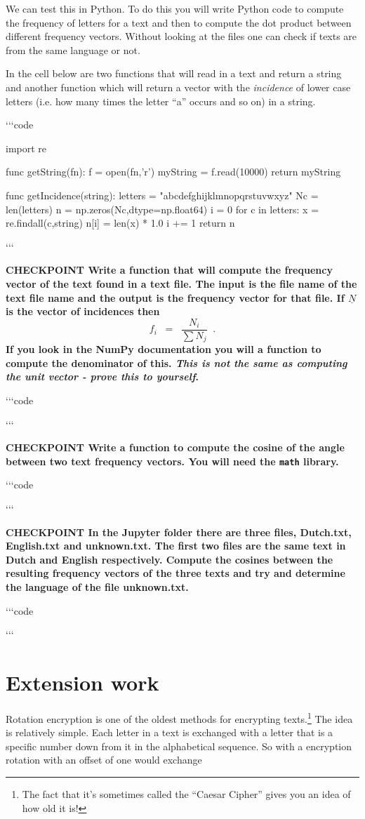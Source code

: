 \documentclass[11pt]{amsart}
\renewcommand{\v}[1]{\underline{#1}}
\newcommand{\cli}[1]{`{}`{}`{}code
#1 
`{}`{}`{}}
\newcommand{\checkpoint}[1]{{\bf CHECKPOINT \newline #1 \newline} 

`{}`{}`{}code
 
`{}`{}`{}
}
\begin{document}
We can test this in Python. To do this you will write Python code to compute the frequency of letters for a text and then to compute the dot product between  different frequency vectors. Without looking at the files one can check if texts are from the same language or not.

In the cell below are two functions that will read in a text  and return a string and another function which will return a vector with the {\it incidence} of lower case letters (i.e. how many times the letter ``a'' occurs and so on) in a string.

\cli{
import re

func getString(fn):
    f = open(fn,'r')
    myString = f.read(10000)
    return myString


func getIncidence(string):
    letters = "abcdefghijklmnopqrstuvwxyz"
    Nc = len(letters)
    n = np.zeros(Nc,dtype=np.float64)
    i = 0
    for c in letters:
        x = re.findall(c,string)
        n[i] = len(x) * 1.0
        i += 1
    return n 
}

 
\checkpoint{Write a function that will compute the frequency vector 
of the text found in a text file. The input is the file name of the text file
name and the output is the frequency vector for that file.
If $\v{N}$ is the vector of incidences then 
\[
f_i \;\; = \;\; \frac{N_i}{\sum N_j} \;\; . 
\] 
If you look in the NumPy documentation you will a function to compute the denominator of this.  
{\it This is not the same as computing the unit vector - prove this to yourself}. 
} 

\checkpoint{Write a function to compute the cosine of the angle between two text frequency vectors. You will need the {\tt math} library.}


\checkpoint{In the Jupyter folder there are three files, Dutch.txt, English.txt and unknown.txt. The first two files are the same text in Dutch and English respectively. Compute the cosines between the 
resulting frequency vectors of the three texts and try and determine the language of the file unknown.txt. }

\section{Extension work}

Rotation encryption is one of the oldest methods for encrypting texts.\footnote{The fact that it's sometimes called the ``Caesar Cipher'' gives you an idea of how old it is!} The idea is relatively simple.
Each letter in a text is exchanged with a letter that is a specific number down from it in the alphabetical
sequence. So with a encryption rotation with an offset of one would exchange
\end{document}
